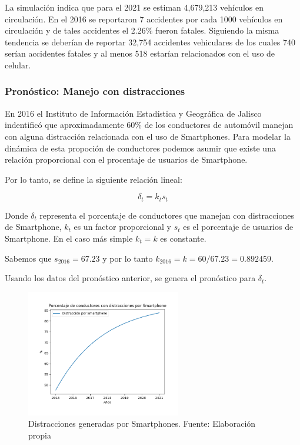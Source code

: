 \documentclass{article}
\begin{document}
La simulación indica que para el 2021 se estiman 4,679,213 vehículos en circulación.
En el 2016 se reportaron 7 accidentes por cada 1000 vehículos en circulación y de tales accidentes el
2.26\% fueron fatales. Siguiendo la misma tendencia se deberían de reportar
32,754 accidentes vehiculares de los cuales 740 serían accidentes fatales
y al menos 518 estarían relacionados con el uso de celular.


\subsubsection{Pronóstico: Manejo con distracciones}

En 2016 el Instituto de Información Estadística y Geográfica de Jalisco indentificó que
aproximadamente 60\% de los conductores de automóvil manejan con alguna distracción
relacionada con el uso de Smartphones. Para modelar la dinámica de esta propoción de conductores podemos
asumir que existe una relación proporcional con el procentaje de usuarios de Smartphone.

Por lo tanto, se define la siguiente relación lineal:

\begin{equation}
\delta_t = k_t s_t
\end{equation}

Donde $\delta_t$ representa el porcentaje de conductores que manejan con distracciones de Smartphone,
$k_t$ es un factor proporcional y $s_t$ es el porcentaje de usuarios de Smartphone. En el caso más
simple $k_t = k$ es constante.


Sabemos que $s_{2016} = 67.23$ y por lo tanto $k_{2016} = k = 60/67.23 = 0.892459$.

Usando los datos del pronóstico anterior, se genera el pronóstico para $\delta_t$.

	\begin{figure}[H]\centering
	\includegraphics[width=0.6\textwidth]{resources/img/distraction.png}
	\caption{\label{fig:distr} Distracciones generadas por Smartphones. Fuente: Elaboración propia}
    \end{figure}
\end{document}
